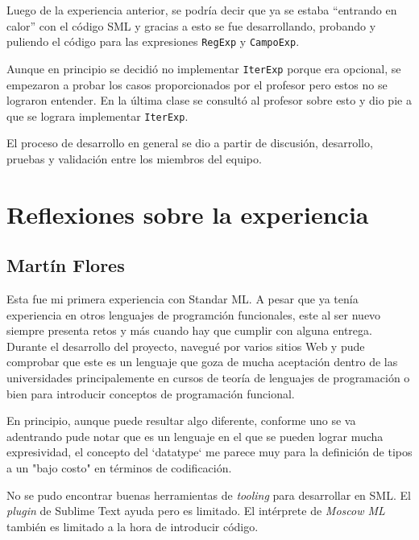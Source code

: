 \documentclass[12pt, times]{simauth}
\begin{document}
Luego de la experiencia anterior, se podría decir que ya se estaba ``entrando en calor'' con el código SML y gracias a esto se fue desarrollando, probando y puliendo el código para las expresiones \texttt{RegExp} y \texttt{CampoExp}. 

Aunque en principio se decidió no implementar \texttt{IterExp} porque era opcional, se empezaron a probar los casos proporcionados por el profesor pero estos no se lograron entender. En la última clase se consultó al profesor sobre esto y dio pie a que se lograra implementar \texttt{IterExp}.

El proceso de desarrollo en general se dio a partir de discusión, desarrollo, pruebas y validación entre los miembros del equipo.

\section{Reflexiones sobre la experiencia}

\subsection{Martín Flores}
Esta fue mi primera experiencia con Standar ML. A pesar que ya tenía experiencia en otros lenguajes de programción funcionales, este al ser nuevo siempre presenta retos y más cuando hay que cumplir con alguna entrega. Durante el desarrollo del proyecto, navegué por varios sitios Web y pude comprobar que este es un lenguaje que goza de mucha aceptación dentro de las universidades principalemente en cursos de teoría de lenguajes de programación o bien para introducir conceptos de programación funcional.

En principio, aunque puede resultar algo diferente, conforme uno se va adentrando pude notar que es un lenguaje en el que se pueden lograr mucha expresividad, el concepto del `datatype` me parece muy para la definición de tipos a un "bajo costo" en términos de codificación. 

No se pudo encontrar buenas herramientas de \emph{tooling} para desarrollar en SML. El \emph{plugin} de Sublime Text ayuda pero es limitado. El intérprete de \emph{Moscow ML} también es limitado a la hora de introducir código.
\end{document}
